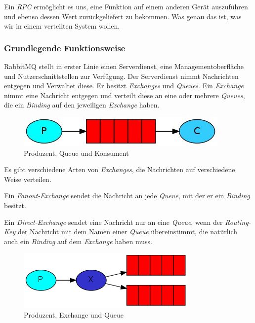 \documentclass[12pt,a4paper]{scrartcl}
\begin{document}
Ein \emph{RPC} ermöglicht es uns, eine Funktion auf einem anderen Gerät auszuführen und ebenso dessen Wert zurückgeliefert zu bekommen. Was genau das ist, was wir in einem verteilten System wollen.

\subsubsection{Grundlegende Funktionsweise}

RabbitMQ stellt in erster Linie einen Serverdienst, eine Managementoberfläche und Nutzerschnittstellen zur Verfügung. Der Serverdienst nimmt Nachrichten entgegen und Verwaltet diese. 
Er besitzt \emph{Exchanges} und \emph{Queues}. Ein \emph{Exchange} nimmt eine Nachricht entgegen und verteilt diese an eine oder mehrere \emph{Queues}, die ein \emph{Binding} auf den jeweiligen \emph{Exchange} haben. 

\begin{figure}[h!]
	\centering
	\includegraphics[scale=1]{P2C.jpg}
	\caption[https://www.rabbitmq.com/tutorials/tutorial-one-dotnet.html]{Produzent, Queue und Konsument}
\end{figure}

Es gibt verschiedene Arten von \emph{Exchanges}, die Nachrichten auf verschiedene Weise verteilen. 

Ein \emph{Fanout-Exchange} sendet die Nachricht an jede \emph{Queue}, mit der er ein \emph{Binding} besitzt. 

Ein \emph{Direct-Exchange} sendet eine Nachricht nur an eine \emph{Queue}, wenn der \emph{Routing-Key} der Nachricht mit dem Namen einer \emph{Queue} übereinstimmt, die natürlich auch ein \emph{Binding} auf dem \emph{Exchange} haben muss.

\begin{figure}[h!]
	\centering
	\includegraphics[scale=1.65]{exchanges.png}
	\caption[https://www.rabbitmq.com/tutorials/tutorial-three-dotnet.html]{Produzent, Exchange und Queue}
\end{figure}
\end{document}
